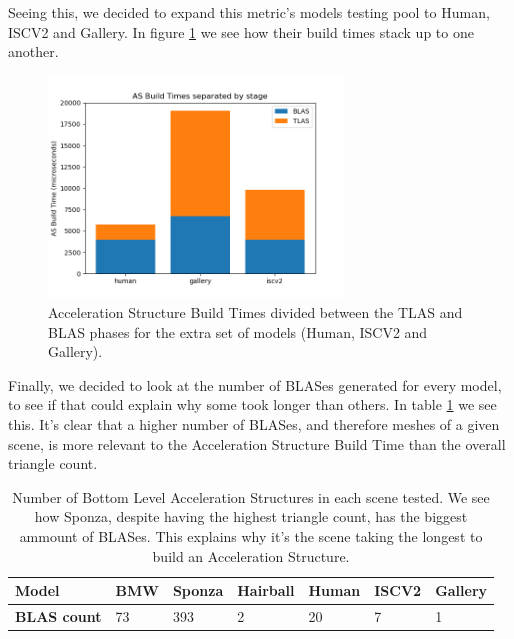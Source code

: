 Seeing this, we decided to expand this metric's models testing pool to Human, ISCV2 and Gallery. In figure \ref{as-extra-build-time-decomposed} we see how their build times stack up to one another.

\begin{figure}[hbt!]
    \centering
    \includegraphics[width=0.7\textwidth]{figuras/optix-extra-accelbuildtimes-decomposed.png}
    \caption{Acceleration Structure Build Times divided between the TLAS and BLAS phases for the extra set of models (Human, ISCV2 and Gallery).}
    \label{as-extra-build-time-decomposed}
\end{figure}

Finally, we decided to look at the number of BLASes generated for every model, to see if that could explain why some took longer than others. In table \ref{blas-count-table} we see this. It's clear that a higher number of BLASes, and therefore meshes of a given scene, is more relevant to the Acceleration Structure Build Time than the overall triangle count.

\begin{center}
  \begin{table}
    \begin{tabular}{ | m{3cm}| m{1.5cm} | m{1.5cm} | m{1.5cm} | m{1.5cm} | m{1.5cm} | m{1.5cm} |}
  \hline
  \textbf{Model}& BMW& Sponza& Hairball& Human& ISCV2& Gallery\\
  \hline
      \textbf{BLAS count}& 73& 393& 2& 20& 7& 1\\
  \hline
\end{tabular}
  \label{blas-count-table}
  \caption{Number of Bottom Level Acceleration Structures in each scene tested. We see how Sponza, despite having the highest triangle count, has the biggest ammount of BLASes. This explains why it's the scene taking the longest to build an Acceleration Structure.}
\end{table}
\end{center}
\clearpage
